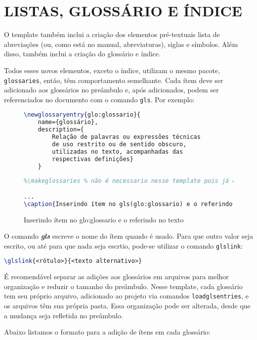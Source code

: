 \chapter{LISTAS, GLOSSÁRIO E ÍNDICE}\label{sec:listasEGlossario}

O template também inclui a criação dos elementos pré-textuais lista de abreviações (ou, como está no manual, abreviaturas), siglas e símbolos. Além disso, também inclui a criação do glossário e índice.

Todos esses novos elementos, exceto o índice, utilizam o mesmo pacote, \texttt{glossaries}, então, têm comportamento semelhante. Cada ítem deve ser adicionado aos glossários no preâmbulo e, após adicionados, podem ser referenciados no documento com o comando \texttt{gls}. Por exemplo:
	
\begin{figure}[!htb]
	\centering
	\caption{Inserindo ítem no \gls{glo:glossario} e o referindo no texto} %
	\label{fig:exemploglossario1} %
	\begin{lstlisting}[language=tex]
\newglossaryentry{glo:glossario}{
	name={glossário}, 
	description={
		Relação de palavras ou expressões técnicas 
		de uso restrito ou de sentido obscuro, 
		utilizadas no texto, acompanhadas das 
		respectivas definições}
	}
		
%\makeglossaries % não é necessario nesse template pois já é chamado na classe

...
\caption{Inserindo ítem no gls(glo:glossario) e o referindo no texto}
	\end{lstlisting}
	
\end{figure}

O comando \textit{\textbf{gls}} escreve o nome do ítem quando é usado. Para que outro valor seja escrito, ou até para que nada seja escrtio, pode-se utilizar o comando \texttt{glslink}:
\begin{lstlisting}[language=tex]
	\glslink{<rótulo>}{<texto alternativo>}
\end{lstlisting}

É recomendável separar as adições aos glossários em arquivos para melhor organização e reduzir o tamanho do preâmbulo. Nesse template, cada glossário tem seu próprio arquivo, adicionado ao projeto via comandos \texttt{loadglsentries}, e os arquivos têm sua própria pasta. Essa organização pode ser alterada, desde que a mudança seja refletida no preâmbulo.

\newpage
Abaixo listamos o formato para a adição de ítens em cada glossário:


